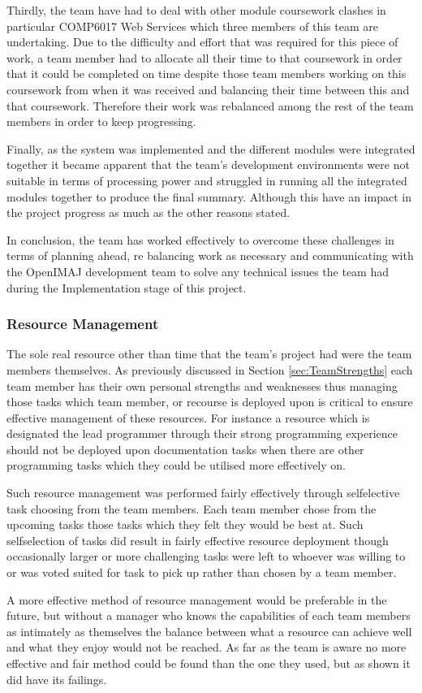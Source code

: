 Thirdly, the team have had to deal with other module coursework clashes in particular COMP6017 Web Services which three members of this team are undertaking. Due to the difficulty and effort that was required for this piece of work, a team member had to allocate all their time to that coursework in order that it could be completed on time despite those team members working on this coursework from when it was received and balancing their time between this and that coursework. Therefore their work was rebalanced among the rest of the team members in order to keep progressing.

Finally, as the system was implemented and the different modules were integrated together it became apparent that the team’s development environments were not suitable in terms of processing power and struggled in running all the integrated modules together to produce the final summary. Although this have an impact in the project progress as much as the other reasons stated.

In conclusion, the team has worked effectively to overcome these challenges in terms of planning ahead, re balancing work as necessary and communicating with the OpenIMAJ development team to solve any technical issues the team had during the Implementation stage of this project.

\subsubsection{Resource Management}

The sole real resource other than time that the team's project had were the team
members themselves. As previously discussed in Section \ref{sec:TeamStrengths}
each team member has their own personal strengths and weaknesses thus managing
those tasks which team member, or recourse is deployed upon is critical to
ensure effective management of these resources. For instance a resource which is
designated the lead programmer through their strong programming experience
should not be deployed upon documentation tasks when there are other programming
tasks which they could be utilised more effectively on.

Such resource management was performed fairly effectively through selfelective
task choosing from the team members. Each team member chose from the upcoming
tasks those tasks which they felt they would be best at. Such selfselection of
tasks did result in fairly effective resource deployment though occasionally
larger or more challenging tasks were left to whoever was willing to or was
voted suited for task to pick up rather than chosen by a team member. 

A more effective method of resource management would be preferable in the
future, but without a manager who knows the capabilities of each team members as
intimately as themselves the balance between what a resource can achieve well
and what they enjoy would not be reached. As far as the team is aware no more
effective and fair method could be found than the one they used, but as shown it
did have its failings.